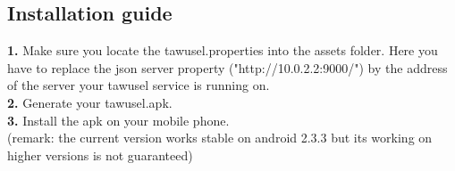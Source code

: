 \subsection{Installation guide}\label{ssec:AndrInst}

\textbf{1.} Make sure you locate the tawusel.properties into the assets folder. Here you have to replace the json server
property ("http://10.0.2.2:9000/") by the address of the server your tawusel service is running on.\\
\textbf{2.} Generate your tawusel.apk.\\
\textbf{3.} Install the apk on your mobile phone.\\
(remark: the current version works stable on android 2.3.3 but its working on higher versions is not guaranteed)